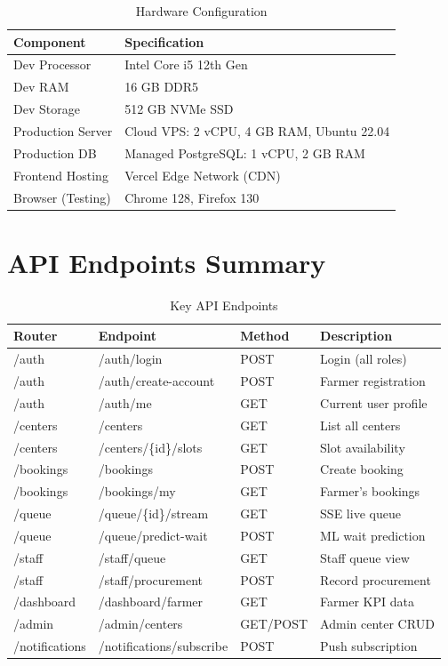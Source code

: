 \begin{table}[h!]
\centering
\caption{Hardware Configuration}
\label{tab:hw-config}
\renewcommand{\arraystretch}{1.15}
\begin{tabular}{|p{4cm}|p{9.5cm}|}
\hline
\textbf{Component} & \textbf{Specification} \\ \hline
Dev Processor & Intel Core i5 12th Gen \\ \hline
Dev RAM & 16 GB DDR5 \\ \hline
Dev Storage & 512 GB NVMe SSD \\ \hline
Production Server & Cloud VPS: 2 vCPU, 4 GB RAM, Ubuntu 22.04 \\ \hline
Production DB & Managed PostgreSQL: 1 vCPU, 2 GB RAM \\ \hline
Frontend Hosting & Vercel Edge Network (CDN) \\ \hline
Browser (Testing) & Chrome 128, Firefox 130 \\ \hline
\end{tabular}
\end{table}

\section{API Endpoints Summary}

\begin{table}[h!]
\centering
\caption{Key API Endpoints}
\label{tab:api}
\renewcommand{\arraystretch}{1.15}
\begin{tabular}{|p{2.5cm}|p{4.5cm}|p{1.8cm}|p{4.5cm}|}
\hline
\textbf{Router} & \textbf{Endpoint} & \textbf{Method} & \textbf{Description} \\ \hline
/auth & /auth/login & POST & Login (all roles) \\ \hline
/auth & /auth/create-account & POST & Farmer registration \\ \hline
/auth & /auth/me & GET & Current user profile \\ \hline
/centers & /centers & GET & List all centers \\ \hline
/centers & /centers/\{id\}/slots & GET & Slot availability \\ \hline
/bookings & /bookings & POST & Create booking \\ \hline
/bookings & /bookings/my & GET & Farmer's bookings \\ \hline
/queue & /queue/\{id\}/stream & GET & SSE live queue \\ \hline
/queue & /queue/predict-wait & POST & ML wait prediction \\ \hline
/staff & /staff/queue & GET & Staff queue view \\ \hline
/staff & /staff/procurement & POST & Record procurement \\ \hline
/dashboard & /dashboard/farmer & GET & Farmer KPI data \\ \hline
/admin & /admin/centers & GET/POST & Admin center CRUD \\ \hline
/notifications & /notifications/subscribe & POST & Push subscription \\ \hline
\end{tabular}
\end{table}
